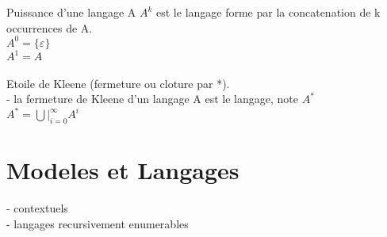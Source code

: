 \documentclass{article}
\begin{document}
Puissance d'une langage A
$A^k$ est le langage forme par la concatenation de k occurrences de A.\\
$A^0 = \{\varepsilon\}$\\
$A^1 = A$\\
\\

Etoile de Kleene (fermeture ou cloture par *).\\
- la fermeture de Kleene d'un langage A est le langage, note $A^*$\\
$A^* = \bigcup|_{i=0}^\infty A^i$\\



\section{Modeles et Langages}
- contextuels\\
- langages recursivement enumerables\\
\end{document}

